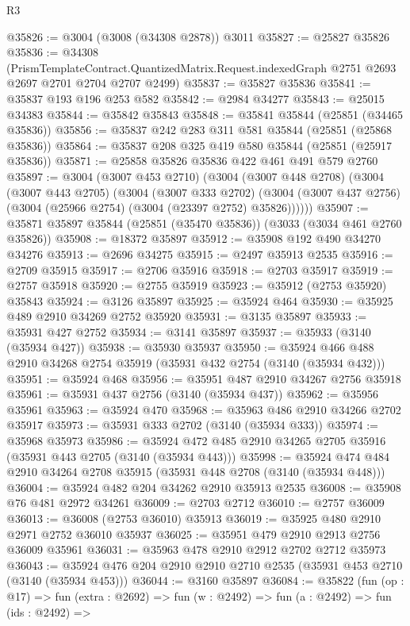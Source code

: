 \begin{lexlean}{R3}
\begin{coremodule}
@35826 := @3004 (@3008 (@34308 @2878)) @3011
@35827 := @25827 @35826
@35836 := @34308
    (PrismTemplateContract.QuantizedMatrix.Request.indexedGraph
      @2751
      @2693
      @2697
      @2701
      @2704
      @2707
      @2499)
@35837 := @35827 @35836
@35841 := @35837 @193 @196 @253 @582
@35842 := @2984 @34277
@35843 := @25015 @34383
@35844 := @35842 @35843
@35848 := @35841 @35844 (@25851 (@34465 @35836))
@35856 := @35837 @242 @283 @311 @581 @35844 (@25851 (@25868 @35836))
@35864 := @35837 @208 @325 @419 @580 @35844 (@25851 (@25917 @35836))
@35871 := @25858 @35826 @35836 @422 @461 @491 @579 @2760
@35897 := @3004
    (@3007 @453 @2710)
    (@3004
      (@3007 @448 @2708)
      (@3004
        (@3007 @443 @2705)
        (@3004
          (@3007 @333 @2702)
          (@3004 (@3007 @437 @2756) (@3004 (@25966 @2754) (@3004 (@23397 @2752) @35826))))))
@35907 := @35871 @35897 @35844 (@25851 (@35470 @35836)) (@3033 (@3034 @461 @2760 @35826))
@35908 := @18372 @35897
@35912 := @35908 @192 @490 @34270 @34276
@35913 := @2696 @34275
@35915 := @2497 @35913 @2535
@35916 := @2709 @35915
@35917 := @2706 @35916
@35918 := @2703 @35917
@35919 := @2757 @35918
@35920 := @2755 @35919
@35923 := @35912 (@2753 @35920) @35843
@35924 := @3126 @35897
@35925 := @35924 @464
@35930 := @35925 @489 @2910 @34269 @2752 @35920
@35931 := @3135 @35897
@35933 := @35931 @427 @2752
@35934 := @3141 @35897
@35937 := @35933 (@3140 (@35934 @427))
@35938 := @35930 @35937
@35950 := @35924 @466 @488 @2910 @34268 @2754 @35919 (@35931 @432 @2754 (@3140 (@35934 @432)))
@35951 := @35924 @468
@35956 := @35951 @487 @2910 @34267 @2756 @35918
@35961 := @35931 @437 @2756 (@3140 (@35934 @437))
@35962 := @35956 @35961
@35963 := @35924 @470
@35968 := @35963 @486 @2910 @34266 @2702 @35917
@35973 := @35931 @333 @2702 (@3140 (@35934 @333))
@35974 := @35968 @35973
@35986 := @35924 @472 @485 @2910 @34265 @2705 @35916 (@35931 @443 @2705 (@3140 (@35934 @443)))
@35998 := @35924 @474 @484 @2910 @34264 @2708 @35915 (@35931 @448 @2708 (@3140 (@35934 @448)))
@36004 := @35924 @482 @204 @34262 @2910 @35913 @2535
@36008 := @35908 @76 @481 @2972 @34261
@36009 := @2703 @2712
@36010 := @2757 @36009
@36013 := @36008 (@2753 @36010) @35913
@36019 := @35925 @480 @2910 @2971 @2752 @36010 @35937
@36025 := @35951 @479 @2910 @2913 @2756 @36009 @35961
@36031 := @35963 @478 @2910 @2912 @2702 @2712 @35973
@36043 := @35924 @476 @204 @2910 @2910 @2710 @2535 (@35931 @453 @2710 (@3140 (@35934 @453)))
@36044 := @3160 @35897
@36084 := @35822
    (fun (op : @17) =>
    fun (extra : @2692) =>
    fun (w : @2492) =>
    fun (a : @2492) =>
    fun (ids : @2492) =>

\end{coremodule}
\end{lexlean}
